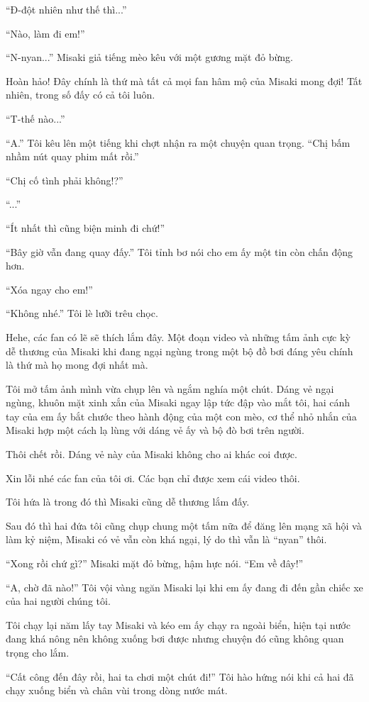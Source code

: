{``Đ-đột nhiên như thế thì...''

``Nào, làm đi em!''

``N-nyan...'' Misaki giả tiếng mèo kêu với một gương mặt đỏ bừng.

Hoàn hảo! Đây chính là thứ mà tất cả mọi fan hâm mộ của Misaki mong đợi!
Tất nhiên, trong số đấy có cả tôi luôn.

``T-thế nào...''

``A.'' Tôi kêu lên một tiếng khi chợt nhận ra một chuyện quan trọng.
``Chị bấm nhầm nút quay phim mất rồi.''

``Chị cố tình phải không!?''

``...''

``Ít nhất thì cũng biện minh đi chứ!''

``Bây giờ vẫn đang quay đấy.'' Tôi tỉnh bơ nói cho em ấy một tin còn
chấn động hơn.

``Xóa ngay cho em!''

``Không nhé.'' Tôi lè lưỡi trêu chọc.

Hehe, các fan có lẽ sẽ thích lắm đây. Một đoạn video và những tấm ảnh
cực kỳ dễ thương của Misaki khi đang ngại ngùng trong một bộ đồ bơi đáng
yêu chính là thứ mà họ mong đợi nhất mà.

Tôi mở tấm ảnh mình vừa chụp lên và ngắm nghía một chút. Dáng vẻ ngại
ngùng, khuôn mặt xinh xắn của Misaki ngay lập tức đập vào mắt tôi, hai
cánh tay của em ấy bắt chước theo hành động của một con mèo, cơ thể nhỏ
nhắn của Misaki hợp một cách lạ lùng với dáng vẻ ấy và bộ đò bơi trên
người.

Thôi chết rồi. Dáng vẻ này của Misaki không cho ai khác coi được.

Xin lỗi nhé các fan của tôi ơi. Các bạn chỉ được xem cái video thôi.

Tôi hứa là trong đó thì Misaki cũng dễ thương lắm đấy.

Sau đó thì hai đứa tôi cũng chụp chung một tấm nữa để đăng lên mạng xã
hội và làm kỷ niệm, Misaki có vẻ vẫn còn khá ngại, lý do thì vẫn là
``nyan'' thôi.

``Xong rồi chứ gì?'' Misaki mặt đỏ bừng, hậm hực nói. ``Em về đây!''

``A, chờ đã nào!'' Tôi vội vàng ngăn Misaki lại khi em ấy đang đi đến
gần chiếc xe của hai người chúng tôi.

Tôi chạy lại năm lấy tay Misaki và kéo em ấy chạy ra ngoài biển, hiện
tại nước đang khá nông nên không xuống bơi được nhưng chuyện đó cũng
không quan trọng cho lắm.

``Cất công đến đây rồi, hai ta chơi một chút đi!'' Tôi hào hứng nói khi
cả hai đã chạy xuống biển và chân vùi trong dòng nước mát.

}
